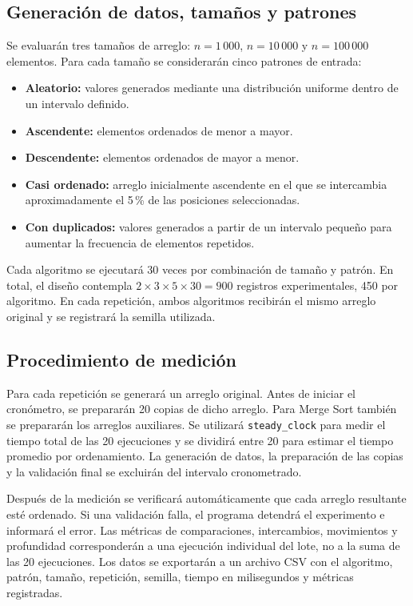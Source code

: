 \subsection{Generación de datos, tamaños y patrones}

Se evaluarán tres tamaños de arreglo: \(n=1\,000\), \(n=10\,000\) y \(n=100\,000\) elementos. Para cada tamaño se considerarán cinco patrones de entrada:

\begin{itemize}
    \item \textbf{Aleatorio:} valores generados mediante una distribución uniforme dentro de un intervalo definido.
    \item \textbf{Ascendente:} elementos ordenados de menor a mayor.
    \item \textbf{Descendente:} elementos ordenados de mayor a menor.
    \item \textbf{Casi ordenado:} arreglo inicialmente ascendente en el que se intercambia aproximadamente el 5\,\% de las posiciones seleccionadas.
    \item \textbf{Con duplicados:} valores generados a partir de un intervalo pequeño para aumentar la frecuencia de elementos repetidos.
\end{itemize}

Cada algoritmo se ejecutará 30 veces por combinación de tamaño y patrón. En total, el diseño contempla \(2\times3\times5\times30=900\) registros experimentales, 450 por algoritmo. En cada repetición, ambos algoritmos recibirán el mismo arreglo original y se registrará la semilla utilizada.

\subsection{Procedimiento de medición}

Para cada repetición se generará un arreglo original. Antes de iniciar el cronómetro, se prepararán 20 copias de dicho arreglo. Para Merge Sort también se prepararán los arreglos auxiliares. Se utilizará \texttt{steady\_clock} para medir el tiempo total de las 20 ejecuciones y se dividirá entre 20 para estimar el tiempo promedio por ordenamiento. La generación de datos, la preparación de las copias y la validación final se excluirán del intervalo cronometrado.

Después de la medición se verificará automáticamente que cada arreglo resultante esté ordenado. Si una validación falla, el programa detendrá el experimento e informará el error. Las métricas de comparaciones, intercambios, movimientos y profundidad corresponderán a una ejecución individual del lote, no a la suma de las 20 ejecuciones. Los datos se exportarán a un archivo CSV con el algoritmo, patrón, tamaño, repetición, semilla, tiempo en milisegundos y métricas registradas.

